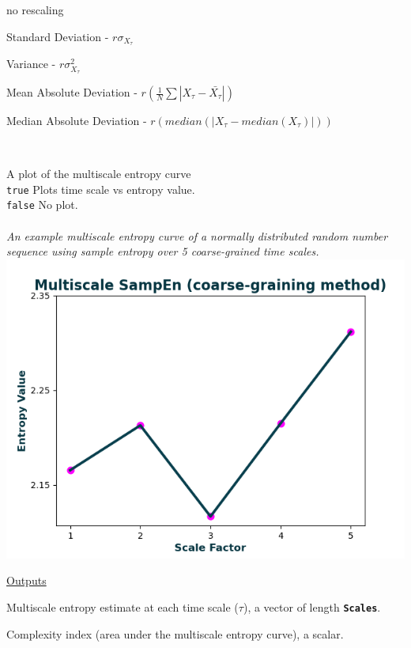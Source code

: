 \documentclass[12pt, a4paper, titlepage, openany]{book}
\begin{document}
\begin{description}[labelsep=1cm, labelwidth=2cm, nosep, style=multiline,leftmargin=3cm]
	\begin{description}[labelsep=5em, labelwidth=4em, nosep,style=multiline,leftmargin=2cm]
		\item[0]	no rescaling
		\item[1]    Standard Deviation          - $r\sigma_{X_\tau}$
        \item[2]    Variance                    - $r\sigma_{X_\tau}^2$
        \item[3]    Mean Absolute Deviation     - $r(\frac{1}{N} \sum |X_{\tau} - \bar{X_{\tau}}|) $
        \item[4]    Median Absolute Deviation   - $r(median(|X_{\tau} - median(X_{\tau})|)) $
	\end{description}
\ \\ 
\item[\texttt{Plotx}]		A plot of the multiscale entropy curve\\
							\texttt{true} \hspace{15pt} Plots time scale vs entropy value.\\
							\texttt{false}\hspace{12pt} No plot.\\ \ \\
			\textit{An example multiscale entropy curve of a normally distributed random number sequence using sample entropy over 5 coarse-grained time scales.}\\
							\includegraphics[scale=.75]{MSEn1.png}
\end{description}

\noindent \ul{Outputs}
\begin{description}[labelsep=1cm, labelwidth=2cm, nosep, style=multiline,leftmargin=3cm]\footnotesize
\item[\texttt{MSx}]		Multiscale entropy estimate at each time scale ($\tau$), a vector of length 											\textbf{\texttt{Scales}}.
\item[\texttt{Ci}]		Complexity index (area under the multiscale entropy curve), a scalar.
\end{description}
\end{document}
